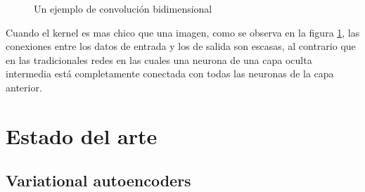 \documentclass[spanish]{article}
\begin{document}
\begin{figure}[H]
\caption{Un ejemplo de convolución bidimensional \cite{goodfellow2016deep}}
\label{convolucion}
\end{figure}

Cuando el kernel es mas chico que una imagen, como se observa en la
figura \ref{convolucion}, las conexiones entre los datos de entrada
y los de salida son escasas, al contrario que en las tradicionales
redes en las cuales una neurona de una capa oculta intermedia está
completamente conectada con todas las neuronas de la capa anterior.

\clearpage

\section{Estado del arte}

\subsection{Variational autoencoders}
\end{document}
